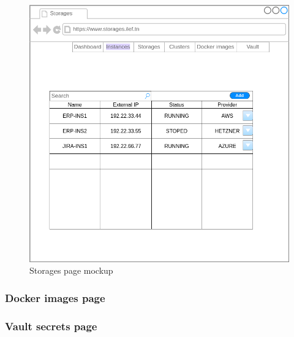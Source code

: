 \begin{figure}[h]
  \center
  \includegraphics[width=13cm]{mockup-storages.png}
  \caption{Storages page mockup}
  \label{fig:mockup-storages}
\end{figure}

\subsubsection{Docker images page}



\subsubsection{Vault secrets page}

